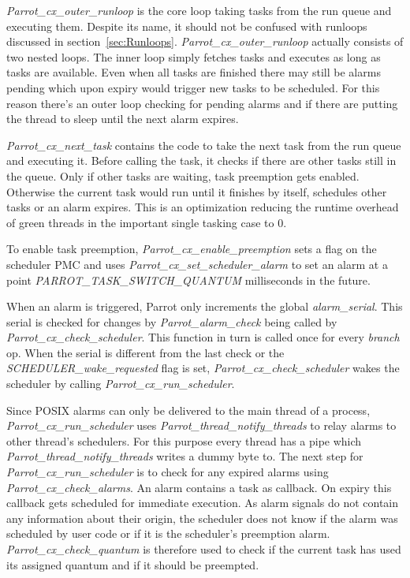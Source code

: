 \documentclass[bachelor,english]{hgbthesis}
\begin{document}
\textit{Parrot\_cx\_outer\_runloop} is the core loop taking tasks from the run queue and executing them. Despite its name, it should not be confused with runloops discussed in section~\ref{sec:Runloops}. \textit{Parrot\_cx\_outer\_runloop} actually consists of two nested loops. The inner loop simply fetches tasks and executes as long as tasks are available. Even when all tasks are finished there may still be alarms pending which upon expiry would trigger new tasks to be scheduled. For this reason there's an outer loop checking for pending alarms and if there are putting the thread to sleep until the next alarm expires.

\textit{Parrot\_cx\_next\_task} contains the code to take the next task from the run queue and executing it. Before calling the task, it checks if there are other tasks still in the queue. Only if other tasks are waiting, task preemption gets enabled. Otherwise the current task would run until it finishes by itself, schedules other tasks or an alarm expires. This is an optimization reducing the runtime overhead of green threads in the important single tasking case to 0.

To enable task preemption, \textit{Parrot\_cx\_enable\_preemption} sets a flag on the scheduler PMC and uses \textit{Parrot\_cx\_set\_scheduler\_alarm} to set an alarm at a point \textit{PARROT\_TASK\_SWITCH\_QUANTUM} milliseconds in the future.

When an alarm is triggered, Parrot only increments the global \textit{alarm\_serial}. This serial is checked for changes by \textit{Parrot\_alarm\_check} being called by \textit{Parrot\_cx\_check\_scheduler}. This function in turn is called once for every \textit{branch} op. When the serial is different from the last check or the \textit{SCHEDULER\_wake\_requested} flag is set, \textit{Parrot\_cx\_check\_scheduler} wakes the scheduler by calling \textit{Parrot\_cx\_run\_scheduler}.

Since POSIX alarms can only be delivered to the main thread of a process, \textit{Parrot\_cx\_run\_scheduler} uses \textit{Parrot\_thread\_notify\_threads} to relay alarms to other thread's schedulers. For this purpose every thread has a pipe which \textit{Parrot\_thread\_notify\_threads} writes a dummy byte to. The next step for \textit{Parrot\_cx\_run\_scheduler} is to check for any expired alarms using \textit{Parrot\_cx\_check\_alarms}. An alarm contains a task as callback. On expiry this callback gets scheduled for immediate execution. As alarm signals do not contain any information about their origin, the scheduler does not know if the alarm was scheduled by user code or if it is the scheduler's preemption alarm. \textit{Parrot\_cx\_check\_quantum} is therefore used to check if the current task has used its assigned quantum and if it should be preempted.
\end{document}
